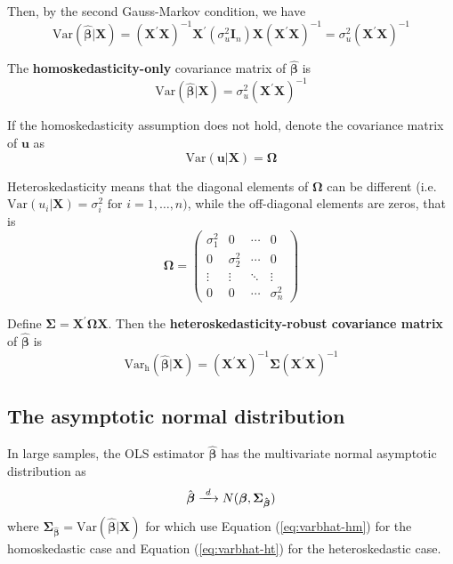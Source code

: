 \documentclass[a4paper,11pt]{article}
\newcommand{\var}{\mathrm{Var}}
\newcommand{\rarrowd}[1]{\xrightarrow{\text{ \textit #1 }}}
\begin{document}
Then, by the second Gauss-Markov condition, we have
\begin{equation*}
\var(\hat{\boldsymbol{\beta}} | \mathbf{X}) = \left(\mathbf{X}^{\prime} \mathbf{X}\right)^{-1} \mathbf{X}^{\prime} (\sigma^2_u \mathbf{I}_n) \mathbf{X} (\mathbf{X}^{\prime} \mathbf{X})^{-1} = \sigma^2_u (\mathbf{X}^{\prime} \mathbf{X})^{-1}
\end{equation*}

The \textbf{homoskedasticity-only} covariance matrix of \(\hat{\boldsymbol{\beta}}\) is
\begin{equation}
\label{eq:varbhat-hm}
\var(\hat{\boldsymbol{\beta}} | \mathbf{X}) = \sigma^2_u (\mathbf{X}^{\prime} \mathbf{X})^{-1}
\end{equation}

If the homoskedasticity assumption does not hold, denote the
covariance matrix of \(\mathbf{u}\) as
\[ \var(\mathbf{u} | \mathbf{X}) = \mathbf{\Omega} \]

Heteroskedasticity means that the diagonal elements of
\(\mathbf{\Omega}\) can be different (i.e. \(\var(u_i | \mathbf{X}) =
\sigma^2_i \text{ for } i=1, \ldots, n)\), while the off-diagonal
elements are zeros, that is
\begin{equation*}
\mathbf{\Omega} =
\begin{pmatrix}
\sigma^2_1 & 0 & \cdots & 0 \\
0 & \sigma^2_2 & \cdots & 0 \\
\vdots & \vdots & \ddots & \vdots \\
0 & 0 & \cdots & \sigma^2_n
\end{pmatrix}
\end{equation*}

Define \(\mathbf{\Sigma} = \mathbf{X}^{\prime} \mathbf{\Omega}
\mathbf{X}\). Then the \textbf{heteroskedasticity-robust covariance matrix} of
\(\hat{\boldsymbol{\beta}}\) is
\begin{equation}
\label{eq:varbhat-ht}
\var_{\mathrm{h}}(\hat{\boldsymbol{\beta}} | \mathbf{X}) = \left(\mathbf{X}^{\prime} \mathbf{X}\right)^{-1} \mathbf{\Sigma} (\mathbf{X}^{\prime} \mathbf{X})^{-1}
\end{equation}


\subsection{The asymptotic normal distribution}
\label{sec:orgabbc298}

In large samples, the OLS estimator \(\hat{\boldsymbol{\beta}}\) has the
multivariate normal asymptotic distribution as
\begin{equation}
\label{eq:normal-bhat-m}
\hat{\boldsymbol{\beta}} \rarrowd{d} N(\boldsymbol{\beta}, \mathbf{\Sigma_{\hat{\boldsymbol{\beta}}}})
\end{equation}
where \(\mathbf{\Sigma_{\hat{\boldsymbol{\beta}}}} =
\var(\hat{\boldsymbol{\beta}} | \mathbf{X})\) for which use
Equation (\ref{eq:varbhat-hm}) for the homoskedastic case and Equation
(\ref{eq:varbhat-ht}) for the heteroskedastic case.
\end{document}
